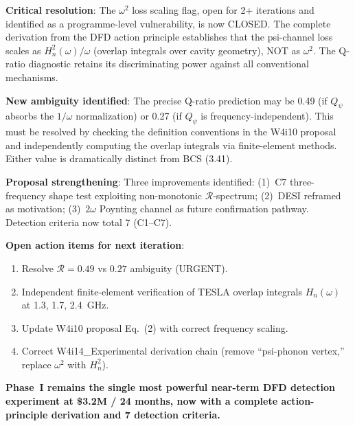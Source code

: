 \documentclass[11pt]{article}
\newcommand{\Qpsi}{Q_\psi}
\newcommand{\Heff}{H_n}
\theoremstyle{definition}
\theoremstyle{remark}
\begin{document}
\begin{tcolorbox}[colback=green!5!white, colframe=green!50!black,
  title=\textbf{W4i15 P11 BOTTOM LINE}]

\textbf{Critical resolution}: The $\omega^2$ loss scaling flag, open
for 2+ iterations and identified as a programme-level vulnerability,
is now CLOSED. The complete derivation from the DFD action principle
establishes that the psi-channel loss scales as $\Heff^2(\omega)/\omega$
(overlap integrals over cavity geometry), NOT as $\omega^2$. The
Q-ratio diagnostic retains its discriminating power against all
conventional mechanisms.

\textbf{New ambiguity identified}: The precise Q-ratio prediction
may be 0.49 (if $\Qpsi$ absorbs the $1/\omega$ normalization) or
0.27 (if $\Qpsi$ is frequency-independent). This must be resolved
by checking the definition conventions in the W4i10 proposal and
independently computing the overlap integrals via finite-element
methods. Either value is dramatically distinct from BCS (3.41).

\textbf{Proposal strengthening}: Three improvements identified:
(1)~C7 three-frequency shape test exploiting non-monotonic
$\mathcal{R}$-spectrum; (2)~DESI reframed as motivation; (3)~$2\omega$
Poynting channel as future confirmation pathway. Detection criteria
now total 7 (C1--C7).

\textbf{Open action items for next iteration}:
\begin{enumerate}[nosep]
\item Resolve $\mathcal{R} = 0.49$ vs $0.27$ ambiguity (URGENT).
\item Independent finite-element verification of TESLA overlap
  integrals $\Heff(\omega)$ at 1.3, 1.7, 2.4~GHz.
\item Update W4i10 proposal Eq.~(2) with correct frequency scaling.
\item Correct W4i14\_Experimental derivation chain (remove
  ``psi-phonon vertex,'' replace $\omega^2$ with $\Heff^2$).
\end{enumerate}

\textbf{Phase~I remains the single most powerful near-term DFD
detection experiment at \$3.2M / 24 months, now with a complete
action-principle derivation and 7 detection criteria.}

\end{tcolorbox}
\end{document}
